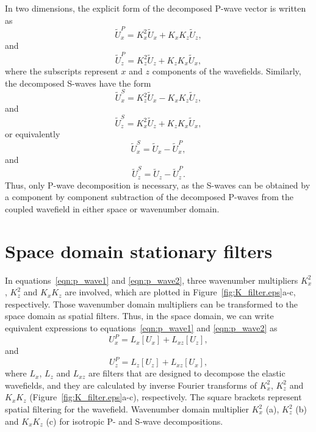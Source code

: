 \documentclass[manuscript,ulem,graphix,revised]{geophysics}
\begin{document}
In two dimensions, the explicit form of the decomposed P-wave vector is written as
\begin{equation}
\tilde{U}^P_x = K^2_x \tilde{U}_x + K_x K_z \tilde{U}_z,
\label{eqn:p_wave1}
\end{equation}
and 
\begin{equation}
\tilde{U}^P_z = K^2_z \tilde{U}_z + K_z K_x \tilde{U}_x,
\label{eqn:p_wave2}
\end{equation}
where the subscripts represent $x$ and $z$ components of the wavefields. Similarly, the decomposed S-waves have the form
\begin{equation}
\tilde{U}^S_x = K^2_z \tilde{U}_x - K_x K_z \tilde{U}_z,
\label{eqn:s_wave1}
\end{equation}
and 
\begin{equation}
\tilde{U}^S_z = K^2_x \tilde{U}_z + K_z K_x \tilde{U}_x,
\label{eqn:s_wave2}
\end{equation}
or equivalently
\begin{equation}
\tilde{U}^S_x = \tilde{U}_x - \tilde{U}^P_x,
\label{eqn:s_wave3}
\end{equation}
and 
\begin{equation}
\tilde{U}^S_z = \tilde{U}_z - \tilde{U}^P_z.
\label{eqn:s_wave4}
\end{equation}
Thus, only P-wave decomposition is necessary, as the S-waves can be obtained by a component by component subtraction of the decomposed P-waves from the coupled wavefield in either space or wavenumber domain.

\section{Space domain stationary filters}

In equations~\ref{eqn:p_wave1} and \ref{eqn:p_wave2}, three wavenumber multipliers $K^2_x$, $K^2_z$ and $K_xK_z$ are involved, which are plotted in Figure~\ref{fig:K_filter.eps}a-c, respectively. 
Those wavenumber domain multipliers can be transformed to the space domain as spatial filters. Thus, in the space domain, we can write equivalent expressions to equations~\ref{eqn:p_wave1} and \ref{eqn:p_wave2} as
\begin{equation}
U^P_x = L_x [U_x] + L_{xz} [U_z],
\label{eqn:p_space1}
\end{equation}
and 
\begin{equation}
U^P_z = L_z [U_z] + L_{xz} [U_x],
\label{eqn:p_space2}
\end{equation}
where $L_x$, $L_z$ and $L_{xz}$ are filters that are designed to decompose the elastic wavefields, and they are calculated by inverse Fourier transforms of $K^2_x$, $K^2_z$ and $K_xK_z$ (Figure~\ref{fig:K_filter.eps}a-c), respectively. 
The square brackets represent spatial filtering for the wavefield. 
{
Wavenumber domain multiplier $K^2_x$ (a), $K^2_z$ (b) and $K_xK_z$ (c) for isotropic P- and S-wave decompositions.
}
\end{document}
